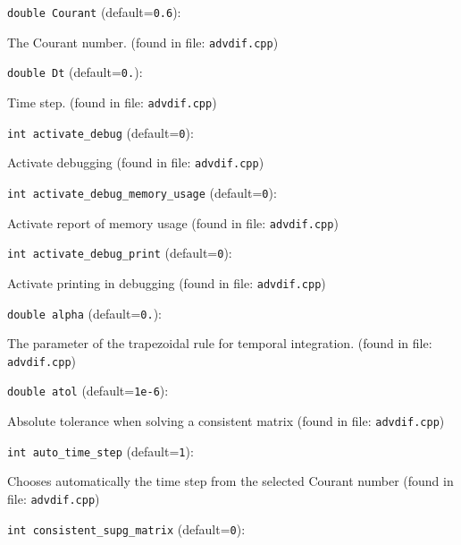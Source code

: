 \item\verb+double Courant+ {\rm(default=\verb|0.6|)}:

The Courant number.
 (found in file: \verb+advdif.cpp+)
\item\verb+double Dt+ {\rm(default=\verb|0.|)}:

Time step. 
 (found in file: \verb+advdif.cpp+)
\item\verb+int activate_debug+ {\rm(default=\verb|0|)}:

Activate debugging
 (found in file: \verb+advdif.cpp+)
\item\verb+int activate_debug_memory_usage+ {\rm(default=\verb|0|)}:

Activate report of memory usage
 (found in file: \verb+advdif.cpp+)
\item\verb+int activate_debug_print+ {\rm(default=\verb|0|)}:

Activate printing in debugging
 (found in file: \verb+advdif.cpp+)
\item\verb+double alpha+ {\rm(default=\verb|0.|)}:

The parameter of the trapezoidal rule
for temporal integration. 
 (found in file: \verb+advdif.cpp+)
\item\verb+double atol+ {\rm(default=\verb|1e-6|)}:

Absolute tolerance when solving a consistent matrix
 (found in file: \verb+advdif.cpp+)
\item\verb+int auto_time_step+ {\rm(default=\verb|1|)}:

Chooses automatically the time step from the 
selected Courant number
 (found in file: \verb+advdif.cpp+)
\item\verb+int consistent_supg_matrix+ {\rm(default=\verb|0|)}:

